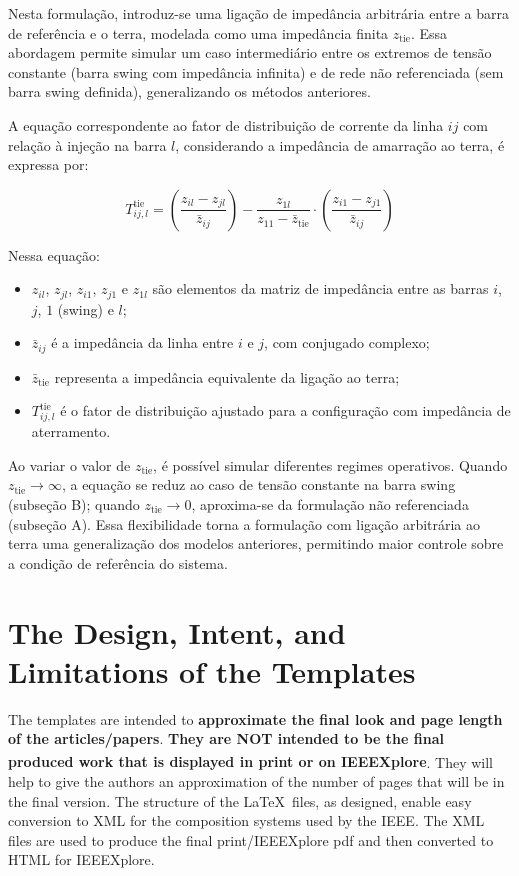 \documentclass[journal]{IEEEtran}
\begin{document}
Nesta formulação, introduz-se uma ligação de impedância arbitrária entre a barra de referência e o terra, modelada como uma impedância finita \( z_{\text{tie}} \). Essa abordagem permite simular um caso intermediário entre os extremos de tensão constante (barra swing com impedância infinita) e de rede não referenciada (sem barra swing definida), generalizando os métodos anteriores.

A equação correspondente ao fator de distribuição de corrente da linha \( ij \) com relação à injeção na barra \( l \), considerando a impedância de amarração ao terra, é expressa por:

\begin{equation}
T^{\text{tie}}_{ij,l} = \left( \frac{z_{il} - z_{jl}}{\bar{z}_{ij}} \right) - \frac{z_{1l}}{z_{11} - \bar{z}_{\text{tie}}} \cdot \left( \frac{z_{i1} - z_{j1}}{\bar{z}_{ij}} \right)
\label{eq:lig_terra}
\end{equation}

Nessa equação:
\begin{itemize}
  \item \( z_{il} \), \( z_{jl} \), \( z_{i1} \), \( z_{j1} \) e \( z_{1l} \) são elementos da matriz de impedância entre as barras \( i \), \( j \), \( 1 \) (swing) e \( l \);
  \item \( \bar{z}_{ij} \) é a impedância da linha entre \( i \) e \( j \), com conjugado complexo;
  \item \( \bar{z}_{\text{tie}} \) representa a impedância equivalente da ligação ao terra;
  \item \( T^{\text{tie}}_{ij,l} \) é o fator de distribuição ajustado para a configuração com impedância de aterramento.
\end{itemize}

Ao variar o valor de \( z_{\text{tie}} \), é possível simular diferentes regimes operativos. Quando \( z_{\text{tie}} \rightarrow \infty \), a equação se reduz ao caso de tensão constante na barra swing (subseção B); quando \( z_{\text{tie}} \rightarrow 0 \), aproxima-se da formulação não referenciada (subseção A). Essa flexibilidade torna a formulação com ligação arbitrária ao terra uma generalização dos modelos anteriores, permitindo maior controle sobre a condição de referência do sistema.


\section{The Design, Intent, and \\ Limitations of the Templates}
The templates are intended to {\bf{approximate the final look and page length of the articles/papers}}. {\bf{They are NOT intended to be the final produced work that is displayed in print or on IEEEXplore\textsuperscript{\textregistered}}}. They will help to give the authors an approximation of the number of pages that will be in the final version. The structure of the \LaTeX\ files, as designed, enable easy conversion to XML for the composition systems used by the IEEE. The XML files are used to produce the final print/IEEEXplore pdf and then converted to HTML for IEEEXplore.
\end{document}
